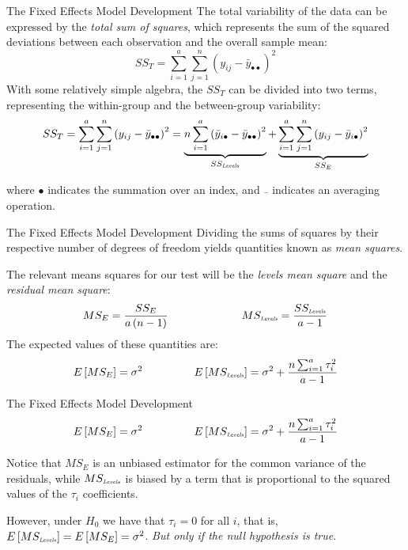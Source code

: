 %
\begin{frame}
{The Fixed Effects Model}
{Development}
The total variability of the data can be expressed by the \textit{total sum of squares}, which represents the sum of the squared deviations between each observation and the overall sample mean:
\begin{equation*}
SS_T = \sum_{i=1}^{a}{\sum_{j=1}^{n}{\left(y_{ij} - \bar{y}_{\bullet\bullet}\right)^2}}
\end{equation*}
With some relatively simple algebra, the $SS_T$ can be divided into two terms, representing the within-group and the between-group variability:
\begin{equation*}
SS_T = \sum_{i=1}^{a}{\sum_{j=1}^{n}{\left(y_{ij} - \bar{y}_{\bullet\bullet}\right)^2}}=\underbrace{n\sum_{i=1}^{a}{\left(\bar{y}_{i\bullet} - \bar{y}_{\bullet\bullet}\right)^2}}_{SS_{\mbox{\tiny\textit{Levels}}}} + \underbrace{\sum_{i=1}^{a}{\sum_{j=1}^{n}{\left(y_{ij}- \bar{y}_{i\bullet}\right)^2}}}_{SS_E}
\end{equation*}

\noindent where $\bullet$ indicates the summation over an index, and $\bar{\ \ }$ indicates an averaging operation.
\end{frame}
%
%
\begin{frame}
{The Fixed Effects Model}
{Development}
Dividing the sums of squares by their respective number of degrees of freedom yields quantities known as \textit{mean squares}.
\bigskip

The relevant means squares for our test will be the \textit{levels mean square} and the \textit{residual mean square}:
\begin{equation*}
MS_E = \frac{SS_E}{a\left(n-1\right)}\ \ \ \ \ \ \ \ \ \ \ \ \ \ \ \ \ \ \ \
MS_{\mbox{\tiny\textit{Levels}}} = \frac{SS_{\mbox{\tiny\textit{Levels}}}}{a-1}
\end{equation*}
The expected values of these quantities are:
\begin{equation*}
E\left[MS_E\right] = \sigma^2\ \ \ \ \ \ \ \ \ \ \ \ \ \ E\left[MS_{\mbox{\tiny\textit{Levels}}}\right] = \sigma^2 + \frac{n\sum_{i=1}^{a}{\tau_i^2}}{a-1}
\end{equation*}

\end{frame}
%
%
\begin{frame}
{The Fixed Effects Model}
{Development}
\begin{equation*}
E\left[MS_E\right] = \sigma^2\ \ \ \ \ \ \ \ \ \ \ \ \ \ E\left[MS_{\mbox{\tiny\textit{Levels}}}\right] = \sigma^2 + \frac{n\sum_{i=1}^{a}{\tau_i^2}}{a-1}
\end{equation*}

Notice that $MS_E$ is an unbiased estimator for the common variance of the residuals, while $MS_{\mbox{\tiny\textit{Levels}}}$ is biased by a term that is proportional to the squared values of the $\tau_i$ coefficients.
\bigskip

However, under $H_0$ we have that $\tau_i=0$ for all $i$, that is, $E\left[MS_{\mbox{\tiny\textit{Levels}}}\right] = E\left[MS_{E}\right] = \sigma^2$. \alert{\textit{But only if the null hypothesis is true}}.
\end{frame}
